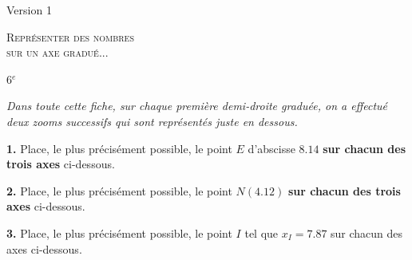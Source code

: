 \documentclass[a4paper,10pt,fleqn,twocolumn,landscape]{article}
\newcommand{\axesZoomBis}[5]{
{} \hfill 
\begin{tikzpicture}
	\def\XA{#1} %
	\def\Nom{#2} %
	\def\Xmin{#3} %
	\setboolean{affichePointilles}{true}  %
	\setboolean{affichePoint}{#4} %
	\setboolean{afficheGraduations}{#5} %
	\setboolean{demiDroite}{true} %
	
	
	\ifthenelse{\boolean{demiDroite}}
	{
		\def\DebordementAGauche{0} %
	}
	{
		\def\DebordementAGauche{0.5} %
	}	
	
	\pgfmathparse{int(\Xmin+10)}\let\Xmax\pgfmathresult; %
		
	\pgfmathparse{int(\XA)}\let\Unites\pgfmathresult;
	\pgfmathparse{int((\XA-\Unites)*10)}\let\Dixiemes\pgfmathresult;
	\pgfmathparse{int(round((\XA-\Unites.\Dixiemes)*100))}\let\Centiemes\pgfmathresult;	

	\pgfmathparse{int(\Unites+1)}\let\UnitesMaj\pgfmathresult;
	\pgfmathparse{int(\Dixiemes+1)}\let\DixiemesMaj\pgfmathresult;
	\pgfmathparse{int(\Centiemes+1)}\let\CentiemesMaj\pgfmathresult;				

	\pgfmathparse{\Xmax+1}\let\Xfleche\pgfmathresult;
	\ifthenelse{\equal{\Xmin}{0}}
	{
		\def\Xorigine{\Xmin} 	
	}
	{
		\pgfmathparse{\Xmin-0.5}\let\Xorigine\pgfmathresult;	
	}

	\pgfmathparse{int(\Xmax-1)}\let\XmaxMoinsUn\pgfmathresult;
	\pgfmathparse{int(\Xmin+1)}\let\XminPlusUn\pgfmathresult;
		
	
	\draw[->,>=latex] (\Xorigine,0) -- (\Xfleche,0);
	\foreach \x in {\XminPlusUn,...,\XmaxMoinsUn}{
		\ifthenelse{\boolean{afficheGraduations}}
		{
			\draw (\x,-.1) -- (\x,.1) node[above] {\x};
		}
		{
			\draw (\x,-.1) -- (\x,.1);
		}
	};
	\foreach \x in {1,...,9}{
		\draw (\Unites.\x,-.05) -- (\Unites.\x,.05);
	}
	\draw (\Xmin,-.1) -- (\Xmin,.1) node[above] {\Xmin};
	\draw (\Xmax,-.1) -- (\Xmax,.1) node[above] {\Xmax};
	\ifthenelse{\not\equal{\Unites}{0}}
	{
		\pgfmathparse{\Xmin-0.5}\let\Xorigine\pgfmathresult;		
	}{}
	\draw[->,>=latex] (\Xorigine,-2) -- (\Xfleche,-2);
	\foreach \x in {1,...,9}{
		\pgfmathparse{int(\Xmin+\x)}\let\X\pgfmathresult;
		\ifthenelse{\boolean{afficheGraduations}}
		{
			\draw (\X,-2.1) -- (\X,-1.9) node[above] {\Unites,\x};
		}
		{
			\draw (\X,-2.1) -- (\X,-1.9);
		}		
		\pgfmathparse{int(\Dixiemes+\Xmin)+\x/10}\let\Xtirets\pgfmathresult;
		\draw (\Xtirets,-2.05) -- (\Xtirets,-1.95);
	};
	
	\ifthenelse{\boolean{afficheGraduations}}
	{	
		\draw (\Xmax,-2.1) -- (\Xmax,-1.9) node[above] {\UnitesMaj};
		\draw (\Xmin,-2.1) -- (\Xmin,-1.9) node[above] {\Unites};
	}
	{
		\draw (\Xmax,-2.1) -- (\Xmax,-1.9) ;
		\draw (\Xmin,-2.1) -- (\Xmin,-1.9) ;		
	}
	
	\pgfmathparse{int(\Dixiemes+\Xmin)}\let\XGaucheAxeBis\pgfmathresult;
	\pgfmathparse{int(\XGaucheAxeBis+1)}\let\XDroitAxeBis\pgfmathresult;

	\ifthenelse{\boolean{affichePointilles}}
	{
	\draw[dashed] (\Unites,0) -- (\Xmin,-2);
	\draw[dashed] (\UnitesMaj,0) -- (\Xmax,-2);
	\draw[dashed] (\XGaucheAxeBis,-2) -- (\Xmin,-4);
	\draw[dashed] (\XDroitAxeBis,-2) -- (\Xmax,-4);
	}{}
	
	\ifthenelse{\not\equal{\Dixiemes}{0}}
	{
		\pgfmathparse{\Xmin-0.5}\let\Xorigine\pgfmathresult;		
	}{}
	\draw[->,>=latex] (\Xorigine,-4) -- (\Xfleche,-4);
	\foreach \x in {1,...,9}{
		\pgfmathparse{int(\Xmin+\x)}\let\X\pgfmathresult;
		\ifthenelse{\boolean{afficheGraduations}}
			{
			\draw (\X,-4.1) -- (\X,-3.9) node[above] {\Unites,\Dixiemes\x};
			}
			{
			\draw (\X,-4.1) -- (\X,-3.9) ;
			}
		};

	
\ifthenelse{\boolean{afficheGraduations}}
	{
	\ifthenelse{\equal{\Dixiemes}{9}}
		{
		\draw (\Xmax,-4.1) -- (\Xmax,-3.9) node[above] {\UnitesMaj};		
		}	
		{
		\draw (\Xmax,-4.1) -- (\Xmax,-3.9) node[above] {\Unites,\DixiemesMaj};
		}	
	
	\ifthenelse{\equal{\Dixiemes}{0}}
		{
		\draw (\Xmin,-4.1) -- (\Xmin,-3.9) node[above] {\Unites};
		}
		{
		\draw (\Xmin,-4.1) -- (\Xmin,-3.9) node[above] {\Unites,\Dixiemes};	
		}
	}
	{
	\ifthenelse{\equal{\Dixiemes}{9}}
		{
		\draw (\Xmax,-4.1) -- (\Xmax,-3.9);		
		}	
		{
		\draw (\Xmax,-4.1) -- (\Xmax,-3.9) ;
		}	
	
	\ifthenelse{\equal{\Dixiemes}{0}}
		{
		\draw (\Xmin,-4.1) -- (\Xmin,-3.9) ;
		}
		{
		\draw (\Xmin,-4.1) -- (\Xmin,-3.9) ;	
		}
	\pgfmathparse{int(\Centiemes+\Xmin)}\let\XGaucheAxeTer\pgfmathresult;
	\draw (\XGaucheAxeTer,-4.1) node[below] {\Nom};
	}
	
	\ifthenelse{\boolean{affichePoint}}
	{
		\draw (\XA,0) node[below] {\Nom};
		\draw (\XGaucheAxeBis.\Centiemes,-2.1) node[below] {\Nom};
	}{}
	
	\draw (7,0) node[below] {$D$};
	\draw (6,-2.1) node[below] {$E$};
\end{tikzpicture}
}
\newcommand{\axesZoomTer}[5]{
{} \hfill 
\begin{tikzpicture}
	\def\XA{#1} %
	\def\Nom{#2} %
	\def\Xmin{#3} %
	\setboolean{affichePointilles}{true}  %
	\setboolean{affichePoint}{#4} %
	\setboolean{afficheGraduations}{#5} %
	\setboolean{demiDroite}{true} %
	
	
	\ifthenelse{\boolean{demiDroite}}
	{
		\def\DebordementAGauche{0} %
	}
	{
		\def\DebordementAGauche{0.5} %
	}	
	
	\pgfmathparse{int(\Xmin+10)}\let\Xmax\pgfmathresult; %
		
	\pgfmathparse{int(\XA)}\let\Unites\pgfmathresult;
	\pgfmathparse{int((\XA-\Unites)*10)}\let\Dixiemes\pgfmathresult;
	\pgfmathparse{int(round((\XA-\Unites.\Dixiemes)*100))}\let\Centiemes\pgfmathresult;	

	\pgfmathparse{int(\Unites+1)}\let\UnitesMaj\pgfmathresult;
	\pgfmathparse{int(\Dixiemes+1)}\let\DixiemesMaj\pgfmathresult;
	\pgfmathparse{int(\Centiemes+1)}\let\CentiemesMaj\pgfmathresult;				

	\pgfmathparse{\Xmax+1}\let\Xfleche\pgfmathresult;
	\ifthenelse{\equal{\Xmin}{0}}
	{
		\def\Xorigine{\Xmin} 	
	}
	{
		\pgfmathparse{\Xmin-0.5}\let\Xorigine\pgfmathresult;	
	}

	\pgfmathparse{int(\Xmax-1)}\let\XmaxMoinsUn\pgfmathresult;
	\pgfmathparse{int(\Xmin+1)}\let\XminPlusUn\pgfmathresult;
		
	
	\draw[->,>=latex] (\Xorigine,0) -- (\Xfleche,0);
	\foreach \x in {\XminPlusUn,...,\XmaxMoinsUn}{
		\ifthenelse{\boolean{afficheGraduations}}
		{
			\draw (\x,-.1) -- (\x,.1) node[above] {\x};
		}
		{
			\draw (\x,-.1) -- (\x,.1);
		}
	};
	\foreach \x in {1,...,9}{
		\draw (\Unites.\x,-.05) -- (\Unites.\x,.05);
	}
	\draw (\Xmin,-.1) -- (\Xmin,.1) node[above] {\Xmin};
	\draw (\Xmax,-.1) -- (\Xmax,.1) node[above] {\Xmax};
	\ifthenelse{\not\equal{\Unites}{0}}
	{
		\pgfmathparse{\Xmin-0.5}\let\Xorigine\pgfmathresult;		
	}{}
	\draw[->,>=latex] (\Xorigine,-2) -- (\Xfleche,-2);
	\foreach \x in {1,...,9}{
		\pgfmathparse{int(\Xmin+\x)}\let\X\pgfmathresult;
		\ifthenelse{\boolean{afficheGraduations}}
		{
			\draw (\X,-2.1) -- (\X,-1.9) node[above] {\Unites,\x};
		}
		{
			\draw (\X,-2.1) -- (\X,-1.9);
		}		
		\pgfmathparse{int(\Dixiemes+\Xmin)+\x/10}\let\Xtirets\pgfmathresult;
		\draw (\Xtirets,-2.05) -- (\Xtirets,-1.95);
	};
	
	\ifthenelse{\boolean{afficheGraduations}}
	{	
		\draw (\Xmax,-2.1) -- (\Xmax,-1.9) node[above] {\UnitesMaj};
		\draw (\Xmin,-2.1) -- (\Xmin,-1.9) node[above] {\Unites};
	}
	{
		\draw (\Xmax,-2.1) -- (\Xmax,-1.9) ;
		\draw (\Xmin,-2.1) -- (\Xmin,-1.9) ;		
	}
	
	\pgfmathparse{int(\Dixiemes+\Xmin)}\let\XGaucheAxeBis\pgfmathresult;
	\pgfmathparse{int(\XGaucheAxeBis+1)}\let\XDroitAxeBis\pgfmathresult;

	\ifthenelse{\boolean{affichePointilles}}
	{
	\draw[dashed] (\Unites,0) -- (\Xmin,-2);
	\draw[dashed] (\UnitesMaj,0) -- (\Xmax,-2);
	\draw[dashed] (\XGaucheAxeBis,-2) -- (\Xmin,-4);
	\draw[dashed] (\XDroitAxeBis,-2) -- (\Xmax,-4);
	}{}
	
	\ifthenelse{\not\equal{\Dixiemes}{0}}
	{
		\pgfmathparse{\Xmin-0.5}\let\Xorigine\pgfmathresult;		
	}{}
	\draw[->,>=latex] (\Xorigine,-4) -- (\Xfleche,-4);
	\foreach \x in {1,...,9}{
		\pgfmathparse{int(\Xmin+\x)}\let\X\pgfmathresult;
		\ifthenelse{\boolean{afficheGraduations}}
			{
			\draw (\X,-4.1) -- (\X,-3.9) node[above] {\Unites,\Dixiemes\x};
			}
			{
			\draw (\X,-4.1) -- (\X,-3.9) ;
			}
		};

	
\ifthenelse{\boolean{afficheGraduations}}
	{
	\ifthenelse{\equal{\Dixiemes}{9}}
		{
		\draw (\Xmax,-4.1) -- (\Xmax,-3.9) node[above] {\UnitesMaj};		
		}	
		{
		\draw (\Xmax,-4.1) -- (\Xmax,-3.9) node[above] {\Unites,\DixiemesMaj};
		}	
	
	\ifthenelse{\equal{\Dixiemes}{0}}
		{
		\draw (\Xmin,-4.1) -- (\Xmin,-3.9) node[above] {\Unites};
		}
		{
		\draw (\Xmin,-4.1) -- (\Xmin,-3.9) node[above] {\Unites,\Dixiemes};	
		}
	}
	{
	\ifthenelse{\equal{\Dixiemes}{9}}
		{
		\draw (\Xmax,-4.1) -- (\Xmax,-3.9);		
		}	
		{
		\draw (\Xmax,-4.1) -- (\Xmax,-3.9) ;
		}	
	
	\ifthenelse{\equal{\Dixiemes}{0}}
		{
		\draw (\Xmin,-4.1) -- (\Xmin,-3.9) ;
		}
		{
		\draw (\Xmin,-4.1) -- (\Xmin,-3.9) ;	
		}
	\pgfmathparse{int(\Centiemes+\Xmin)}\let\XGaucheAxeTer\pgfmathresult;
	\draw (\XGaucheAxeTer,-4.1) node[below] {\Nom};
	}
	
	\ifthenelse{\boolean{affichePoint}}
	{
		\draw (\XA,0) node[below] {\Nom};
		\draw (\XGaucheAxeBis.\Centiemes,-2.1) node[below] {\Nom};
	}{}
	
	\draw (10,0) node[below] {$G$};
	\draw (5,-2.1) node[below] {$H$};
	\draw (11,-4.1) node[below] {$I$};
\end{tikzpicture}
}
\newcommand{\axesZoomTerBis}[5]{
{} \hfill 
\begin{tikzpicture}
	\def\XA{#1} %
	\def\Nom{#2} %
	\def\Xmin{#3} %
	\setboolean{affichePointilles}{true}  %
	\setboolean{affichePoint}{#4} %
	\setboolean{afficheGraduations}{#5} %
	\setboolean{demiDroite}{true} %
	
	
	\ifthenelse{\boolean{demiDroite}}
	{
		\def\DebordementAGauche{0} %
	}
	{
		\def\DebordementAGauche{0.5} %
	}	
	
	\pgfmathparse{int(\Xmin+10)}\let\Xmax\pgfmathresult; %
		
	\pgfmathparse{int(\XA)}\let\Unites\pgfmathresult;
	\pgfmathparse{int((\XA-\Unites)*10)}\let\Dixiemes\pgfmathresult;
	\pgfmathparse{int(round((\XA-\Unites.\Dixiemes)*100))}\let\Centiemes\pgfmathresult;	

	\pgfmathparse{int(\Unites+1)}\let\UnitesMaj\pgfmathresult;
	\pgfmathparse{int(\Dixiemes+1)}\let\DixiemesMaj\pgfmathresult;
	\pgfmathparse{int(\Centiemes+1)}\let\CentiemesMaj\pgfmathresult;				

	\pgfmathparse{\Xmax+1}\let\Xfleche\pgfmathresult;
	\ifthenelse{\equal{\Xmin}{0}}
	{
		\def\Xorigine{\Xmin} 	
	}
	{
		\pgfmathparse{\Xmin-0.5}\let\Xorigine\pgfmathresult;	
	}

	\pgfmathparse{int(\Xmax-1)}\let\XmaxMoinsUn\pgfmathresult;
	\pgfmathparse{int(\Xmin+1)}\let\XminPlusUn\pgfmathresult;
		
	
	\draw[->,>=latex] (\Xorigine,0) -- (\Xfleche,0);
	\foreach \x in {\XminPlusUn,...,\XmaxMoinsUn}{
		\ifthenelse{\boolean{afficheGraduations}}
		{
			\draw (\x,-.1) -- (\x,.1) node[above] {\x};
		}
		{
			\draw (\x,-.1) -- (\x,.1);
		}
	};
	\foreach \x in {1,...,9}{
		\draw (\Unites.\x,-.05) -- (\Unites.\x,.05);
	}
	\draw (\Xmin,-.1) -- (\Xmin,.1) node[above] {\Xmin};
	\draw (\Xmax,-.1) -- (\Xmax,.1) node[above] {\Xmax};
	\ifthenelse{\not\equal{\Unites}{0}}
	{
		\pgfmathparse{\Xmin-0.5}\let\Xorigine\pgfmathresult;		
	}{}
	\draw[->,>=latex] (\Xorigine,-2) -- (\Xfleche,-2);
	\foreach \x in {1,...,9}{
		\pgfmathparse{int(\Xmin+\x)}\let\X\pgfmathresult;
		\ifthenelse{\boolean{afficheGraduations}}
		{
			\draw (\X,-2.1) -- (\X,-1.9) node[above] {\Unites,\x};
		}
		{
			\draw (\X,-2.1) -- (\X,-1.9);
		}		
		\pgfmathparse{int(\Dixiemes+\Xmin)+\x/10}\let\Xtirets\pgfmathresult;
		\draw (\Xtirets,-2.05) -- (\Xtirets,-1.95);
	};
	
	\ifthenelse{\boolean{afficheGraduations}}
	{	
		\draw (\Xmax,-2.1) -- (\Xmax,-1.9) node[above] {\UnitesMaj};
		\draw (\Xmin,-2.1) -- (\Xmin,-1.9) node[above] {\Unites};
	}
	{
		\draw (\Xmax,-2.1) -- (\Xmax,-1.9) ;
		\draw (\Xmin,-2.1) -- (\Xmin,-1.9) ;		
	}
	
	\pgfmathparse{int(\Dixiemes+\Xmin)}\let\XGaucheAxeBis\pgfmathresult;
	\pgfmathparse{int(\XGaucheAxeBis+1)}\let\XDroitAxeBis\pgfmathresult;

	\ifthenelse{\boolean{affichePointilles}}
	{
	\draw[dashed] (\Unites,0) -- (\Xmin,-2);
	\draw[dashed] (\UnitesMaj,0) -- (\Xmax,-2);
	\draw[dashed] (\XGaucheAxeBis,-2) -- (\Xmin,-4);
	\draw[dashed] (\XDroitAxeBis,-2) -- (\Xmax,-4);
	}{}
	
	\ifthenelse{\not\equal{\Dixiemes}{0}}
	{
		\pgfmathparse{\Xmin-0.5}\let\Xorigine\pgfmathresult;		
	}{}
	\draw[->,>=latex] (\Xorigine,-4) -- (\Xfleche,-4);
	\foreach \x in {1,...,9}{
		\pgfmathparse{int(\Xmin+\x)}\let\X\pgfmathresult;
		\ifthenelse{\boolean{afficheGraduations}}
			{
			\draw (\X,-4.1) -- (\X,-3.9) node[above] {\Unites,\Dixiemes\x};
			}
			{
			\draw (\X,-4.1) -- (\X,-3.9) ;
			}
		};

	
\ifthenelse{\boolean{afficheGraduations}}
	{
	\ifthenelse{\equal{\Dixiemes}{9}}
		{
		\draw (\Xmax,-4.1) -- (\Xmax,-3.9) node[above] {\UnitesMaj};		
		}	
		{
		\draw (\Xmax,-4.1) -- (\Xmax,-3.9) node[above] {\Unites,\DixiemesMaj};
		}	
	
	\ifthenelse{\equal{\Dixiemes}{0}}
		{
		\draw (\Xmin,-4.1) -- (\Xmin,-3.9) node[above] {\Unites};
		}
		{
		\draw (\Xmin,-4.1) -- (\Xmin,-3.9) node[above] {\Unites,\Dixiemes};	
		}
	}
	{
	\ifthenelse{\equal{\Dixiemes}{9}}
		{
		\draw (\Xmax,-4.1) -- (\Xmax,-3.9);		
		}	
		{
		\draw (\Xmax,-4.1) -- (\Xmax,-3.9) ;
		}	
	
	\ifthenelse{\equal{\Dixiemes}{0}}
		{
		\draw (\Xmin,-4.1) -- (\Xmin,-3.9) ;
		}
		{
		\draw (\Xmin,-4.1) -- (\Xmin,-3.9) ;	
		}
	\pgfmathparse{int(\Centiemes+\Xmin)}\let\XGaucheAxeTer\pgfmathresult;
	\draw (\XGaucheAxeTer,-4.1) node[below] {\Nom};
	}
	
	\ifthenelse{\boolean{affichePoint}}
	{
		\draw (\XA,0) node[below] {\Nom};
		\draw (\XGaucheAxeBis.\Centiemes,-2.1) node[below] {\Nom};
	}{}
	
	\draw (25,0) node[below] {$L$};
	\draw (18,-2.1) node[below] {$M$};
	\draw (24,-4.1) node[below] {$N$};
\end{tikzpicture}
}
\begin{document}
\begin{minipage}{0.15\linewidth}
Version 1
\end{minipage}\hfill
\begin{minipage}{0.75\linewidth}
\begin{center}
	\textsc{\Large{Représenter des nombres\\ sur un axe gradué...}}
\end{center}
\end{minipage}\hfill
\begin{minipage}{0.1\linewidth}
{} \hfill 6$^e$
\end{minipage}

\medskip

\textit{Dans toute cette fiche, sur chaque première demi-droite graduée, on a effectué deux zooms successifs qui sont représentés juste en dessous.}

\vfill




\textbf{1.} Place, le plus précisément possible, le point $E$ d'abscisse $8.14$ \textbf{sur chacun des trois axes} ci-dessous.

\vfill

{} \hfill 
{}
\hfill {}

\vfill

\textbf{2.} Place, le plus précisément possible, le point $N (4.12)$ \textbf{sur chacun des trois axes} ci-dessous.

\vfill

{} \hfill 
{}
\hfill {}

\vfill

\textbf{3.} Place, le plus précisément possible, le point $I$ tel que $x_{I}=7.87$ sur chacun des axes ci-dessous.

\vfill

{} \hfill 
{}
\hfill {}

\vfill


%
%
%
%
%
%
%
%
%
%
%
%
%
\end{document}
